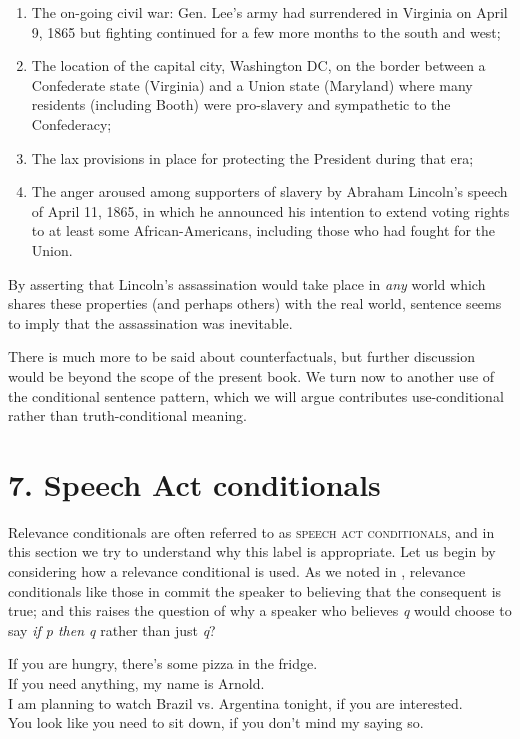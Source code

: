 \begin{enumerate}
\item The on-going civil war: Gen. Lee’s army had surrendered in Virginia on April 9, 1865 but fighting continued for a few more months to the south and west;
\item The location of the capital city, Washington DC, on the border between a Confederate state (Virginia) and a Union state (Maryland) where many residents (including Booth) were pro-slavery and sympathetic to the Confederacy;
\item The lax provisions in place for protecting the President during that era;
\item The anger aroused among supporters of slavery by Abraham Lincoln’s speech of April 11, 1865, in which he announced his intention to extend voting rights to at least some African-Americans, including those who had fought for the Union.
\end{enumerate}

By asserting that Lincoln’s assassination would take place in \textit{any} world which shares these properties (and perhaps others) with the real world, sentence  seems to imply that the assassination was inevitable.



There is much more to be said about counterfactuals, but further discussion would be beyond the scope of the present book. We turn now to another use of the conditional sentence pattern, which we will argue contributes use-conditional rather than truth-conditional meaning.


\section{7. Speech Act conditionals}\label{sec:}

Relevance conditionals are often referred to as \textsc{speech act conditionals}, and in this section we try to understand why this label is appropriate. Let us begin by considering how a relevance conditional is used. As we noted in , relevance conditionals like those in  commit the speaker to believing that the consequent is true; and this raises the question of why a speaker who believes \textit{q} would choose to say \textit{if p then q} rather than just \textit{q}?


\ea
\ea If you are hungry, there’s some pizza in the fridge.\\
\ex If you need anything, my name is Arnold.\\
\ex I am planning to watch Brazil vs. Argentina tonight, if you are interested.\\
\ex You look like you need to sit down, if you don’t mind my saying so.
                       \z
\z


